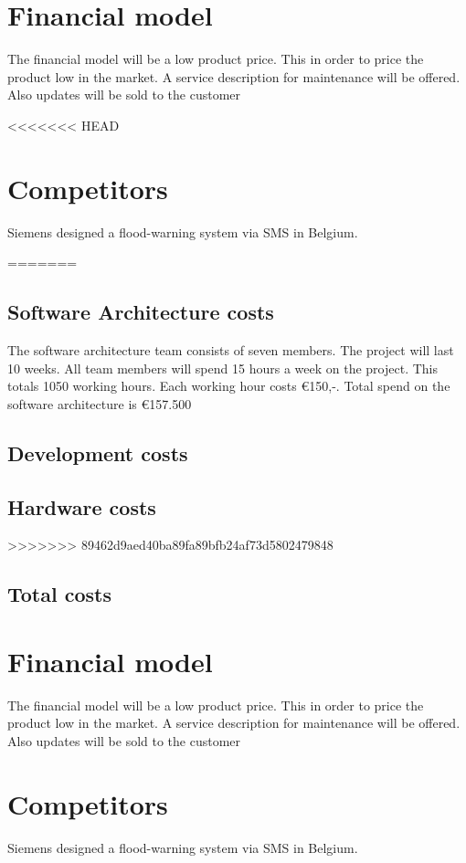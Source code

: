 \section{Financial model}
The financial model will be a low product price. This in order to price the product low in the market. A service description for maintenance will be offered. Also updates will be sold to the customer

<<<<<<< HEAD
\section{Competitors}
Siemens designed a flood-warning system via SMS in Belgium.

=======
\subsection{Software Architecture costs}
The software architecture team consists of seven members. The project will last 10 weeks. All team members will spend 15 hours a week on the project. This totals 1050 working hours. Each working hour costs €150,-. Total spend on the software architecture is €157.500
\subsection{Development costs}

\subsection{Hardware costs}
>>>>>>> 89462d9aed40ba89fa89bfb24af73d5802479848

\subsection{Total costs}


\section{Financial model}
The financial model will be a low product price. This in order to price the product low in the market. A service description for maintenance will be offered. Also updates will be sold to the customer

\section{Competitors}
Siemens designed a flood-warning system via SMS in Belgium.

